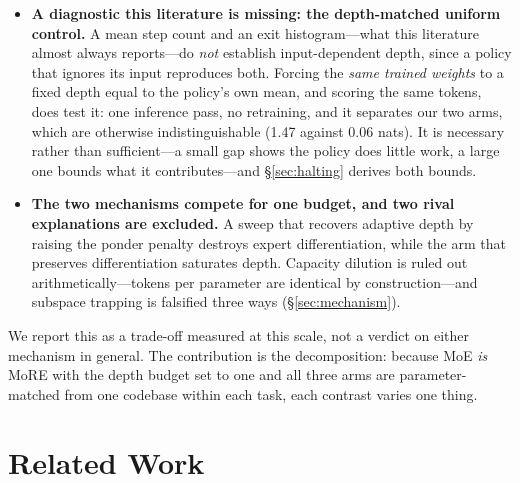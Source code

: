 \begin{itemize}[leftmargin=1.4em,itemsep=1.5pt,topsep=2pt]
\item \textbf{A diagnostic this literature is missing: the depth-matched uniform
  control.} A mean step count and an exit histogram---what this literature almost
  always reports---do \emph{not} establish input-dependent depth, since a policy
  that ignores its input reproduces both. Forcing the \emph{same trained weights}
  to a fixed depth equal to the policy's own mean, and scoring the same tokens,
  does test it: one inference pass, no retraining, and it separates our two arms,
  which are otherwise indistinguishable (1.47 against 0.06 nats). It is necessary
  rather than sufficient---a small gap shows the policy does little work, a large
  one bounds what it contributes---and \S\ref{sec:halting} derives both bounds.

\item \textbf{The two mechanisms compete for one budget, and two rival
  explanations are excluded.} A sweep that recovers adaptive depth by raising the
  ponder penalty destroys expert differentiation, while the arm that preserves
  differentiation saturates depth. Capacity dilution is ruled out
  arithmetically---tokens per parameter are identical by construction---and
  subspace trapping is falsified three ways (\S\ref{sec:mechanism}).

\end{itemize}

We report this as a trade-off measured at this scale, not a verdict on either
mechanism in general. The contribution is the decomposition: because MoE
\emph{is} MoRE with the depth budget set to one and all three arms are
parameter-matched from one codebase within each task, each contrast varies one
thing.

\section{Related Work}
\label{sec:related}

